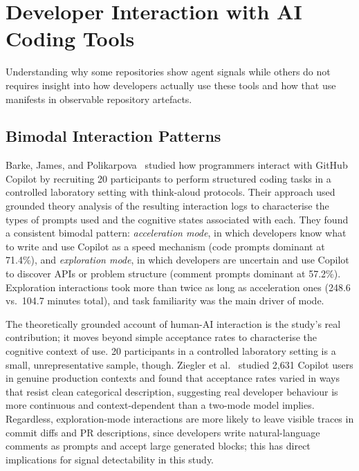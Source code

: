 \section{Developer Interaction with AI Coding Tools}
\label{sec:lr:interaction}

Understanding why some repositories show agent signals while others do not
requires insight into how developers actually use these tools and how that use
manifests in observable repository artefacts.

\subsection{Bimodal Interaction Patterns}

Barke, James, and Polikarpova~\cite{barke2023} studied how programmers interact
with GitHub Copilot by recruiting 20 participants to perform structured coding
tasks in a controlled laboratory setting with think-aloud protocols. Their approach
used grounded theory analysis of the resulting interaction logs to characterise the
types of prompts used and the cognitive states associated with each. They found a
consistent bimodal pattern: \emph{acceleration mode}, in which developers know what
to write and use Copilot as a speed mechanism (code prompts dominant at 71.4\%),
and \emph{exploration mode}, in which developers are uncertain and use Copilot to
discover APIs or problem structure (comment prompts dominant at 57.2\%). Exploration
interactions took more than twice as long as acceleration ones (248.6 vs.\ 104.7
minutes total), and task familiarity was the main driver of mode.

The theoretically grounded account of human-AI interaction is the study's real
contribution; it moves beyond simple acceptance rates to characterise the cognitive
context of use. 20 participants in a controlled laboratory setting is a small,
unrepresentative sample, though. Ziegler et al.~\cite{ziegler2022} studied 2,631
Copilot users in genuine production contexts and found that acceptance rates varied
in ways that resist clean categorical description, suggesting real developer behaviour
is more continuous and context-dependent than a two-mode model implies. Regardless,
exploration-mode interactions are more likely to leave visible traces in commit diffs
and PR descriptions, since developers write natural-language comments as prompts and
accept large generated blocks; this has direct implications for signal detectability
in this study.

